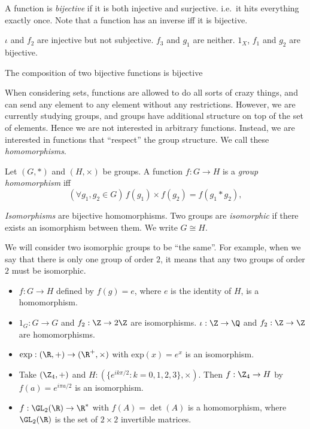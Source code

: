 \documentclass[a4paper]{article}
\begin{document}
\begin{defi}
  A function is \emph{bijective} if it is both injective and surjective. i.e.\ it hits everything exactly once. Note that a function has an inverse iff it is bijective.
\end{defi}

\begin{eg}
  $\iota$ and $f_2$ are injective but not subjective. $f_3$ and $g_1$ are neither. $1_X$, $f_1$ and $g_2$ are bijective.
\end{eg}

\begin{lemma}
  The composition of two bijective functions is bijective
\end{lemma}

When considering sets, functions are allowed to do all sorts of crazy things, and can send any element to any element without any restrictions. However, we are currently studying groups, and groups have additional structure on top of the set of elements. Hence we are not interested in arbitrary functions. Instead, we are interested in functions that ``respect'' the group structure. We call these \emph{homomorphisms}.
\begin{defi}
  Let $(G, *)$ and $(H, \times)$ be groups. A function $f:G\rightarrow H$ is a \emph{group homomorphism} iff
  \[
   ( \forall g_1, g_2 \in G)\, f(g_1)\times f(g_2) = f(g_1 * g_2),
  \]
\end{defi}

\begin{defi}
  \emph{Isomorphisms} are bijective homomorphisms. Two groups are \emph{isomorphic} if there exists an isomorphism between them. We write $G\cong H$.
\end{defi}
We will consider two isomorphic groups to be ``the same''. For example, when we say that there is only one group of order $2$, it means that any two groups of order $2$ must be isomorphic.

\begin{eg}\leavevmode
  \begin{itemize}
    \item $f: G \to H$ defined by $f(g) = e$, where $e$ is the identity of $H$, is a homomorphism.
    \item $1_G: G \rightarrow G$ and $f_2: \Z \rightarrow 2\Z$ are isomorphisms. $\iota: \Z\rightarrow\Q$ and $f_2:\Z\rightarrow\Z$ are homomorphisms.
    \item $\mathrm{exp}: (\R, +) \rightarrow (\R^+, \times)$ with $\mathrm{exp}(x) = e^x$ is an isomorphism.
    \item Take $(\Z_4, +)$ and $H: (\{e^{ik\pi/2}:k=0, 1 ,2, 3\}, \times)$. Then $f: \Z_4 \rightarrow H$ by $f(a) = e^{i\pi a/2}$ is an isomorphism.
    \item $f: \GL_2(\R) \rightarrow \R^*$ with $f(A) = \det(A)$ is a homomorphism, where $\GL_2(\R)$ is the set of $2\times 2$ invertible matrices.
  \end{itemize}
\end{eg}
\end{document}
